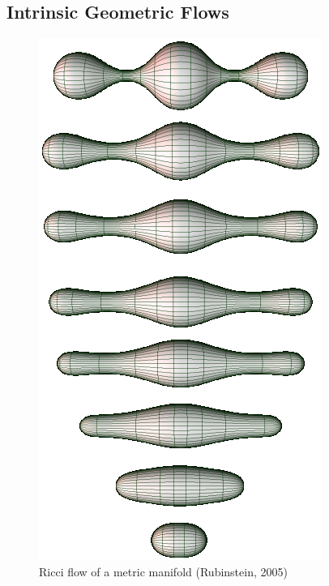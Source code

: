 \documentclass{article}
\begin{document}
\subsection{Intrinsic Geometric Flows}
    \begin{figure}
        \vspace{0.3cm}
        \centering
        \includegraphics[scale=0.3]{ricci-flow.png}
        \\ Ricci flow of a metric manifold (Rubinstein, 2005)
    \end{figure}
    
\end{document}
